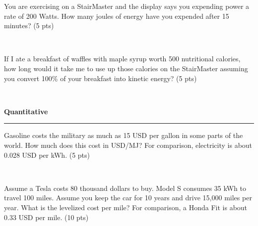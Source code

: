 \documentclass[12pt, oneside]{article}
\newif\ifsolution
\newcommand{\chead}[1]
{\begin{center}\large\textbf{#1}\end{center}
\hrule
\vspace{10pt}}
\newcommand{\solution}[1]
{\ifsolution
Answer: {\it #1}
\else\fi}
\begin{document}
%

You are exercising on a StairMaster and the display says you expending
power a rate of 200 Watts.  How many joules of energy have you expended
after 15 minutes? (5 pts)

\framebox[2.5in]{\rule{0cm}{1.5cm}}\\

\solution{
Energy equals power multiplied by time.

$$ 200W \cdot 15 min \cdot \frac{60 sec}{1 min} = 180 kJ $$
}


\vfill

If I ate a breakfast of waffles with maple syrup worth 500 nutritional
calories, how
long would it take me to use up those calories on the StairMaster
assuming you convert 100\% of your breakfast into kinetic energy? (5
pts)

\framebox[2.5in]{\rule{0cm}{1.5cm}}\\

\solution{
Here I assume that we are 100\% efficient in the conversion of food chemical
energy to kinetic energy.  Using energy equals power multiplied by time
and the rate of energy use we determined in c:

$$ 500 kcal = \frac{43 kcal}{15 min} \cdot X min $$
$$ X = 500 kcal \cdot  \frac{15 min}{43 kcal} = 174 min $$

Which is slightly less than 3 hours.
}

\vfill

\newpage
\chead{Quantitative}

Gasoline costs the military as much as 15 USD per gallon in some parts
of the world.  How much does this cost in USD/MJ?  For comparison,
electricity is about 0.028 USD per kWh. (5 pts)

\framebox[2.5in]{\rule{0cm}{1.5cm}}\\

\vfill

Assume a Tesla costs 80 thousand dollars to buy.  Model
S consumes 35 kWh to travel 100 miles.  Assume you keep the car for 10
years and drive 15,000 miles per year.  What is
the levelized cost per mile? For comparison, a Honda Fit is about 0.33
USD per mile.  (10 pts)

\framebox[2.5in]{\rule{0cm}{1.5cm}}\\
\end{document}
